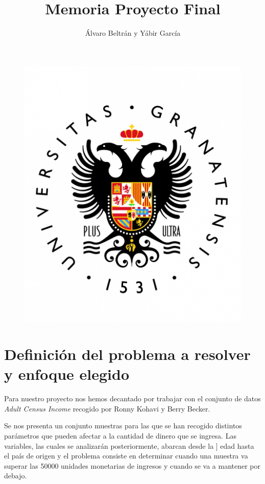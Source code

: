 \documentclass[a4paper,11pt]{article}
\title{Memoria Proyecto Final}
\author{Álvaro Beltrán y Yábir García}
\begin{document}
\maketitle

\begin{figure}[h]
\includegraphics[scale=0.3]{UGR}
\centering
\end{figure}

\newpage

\renewcommand*\contentsname{Índice}
\tableofcontents

\newpage

\section{Definición del problema a resolver y enfoque elegido}

Para nuestro proyecto nos hemos decantado por trabajar con el conjunto de datos
\textit{Adult Census Income} recogido por Ronny Kohavi y Berry Becker. 

Se nos presenta un conjunto muestras para las que se han recogido distintos
parámetros que pueden afectar a la cantidad de dinero que se ingresa. Las
variables, las cuales se analizarán posteriormente, abarcan desde la ] edad
hasta el país de origen y el problema consiste en determinar cuando una muestra
va superar las 50000 unidades monetarias de ingresos y cuando se va a mantener
por debajo.
\end{document}
